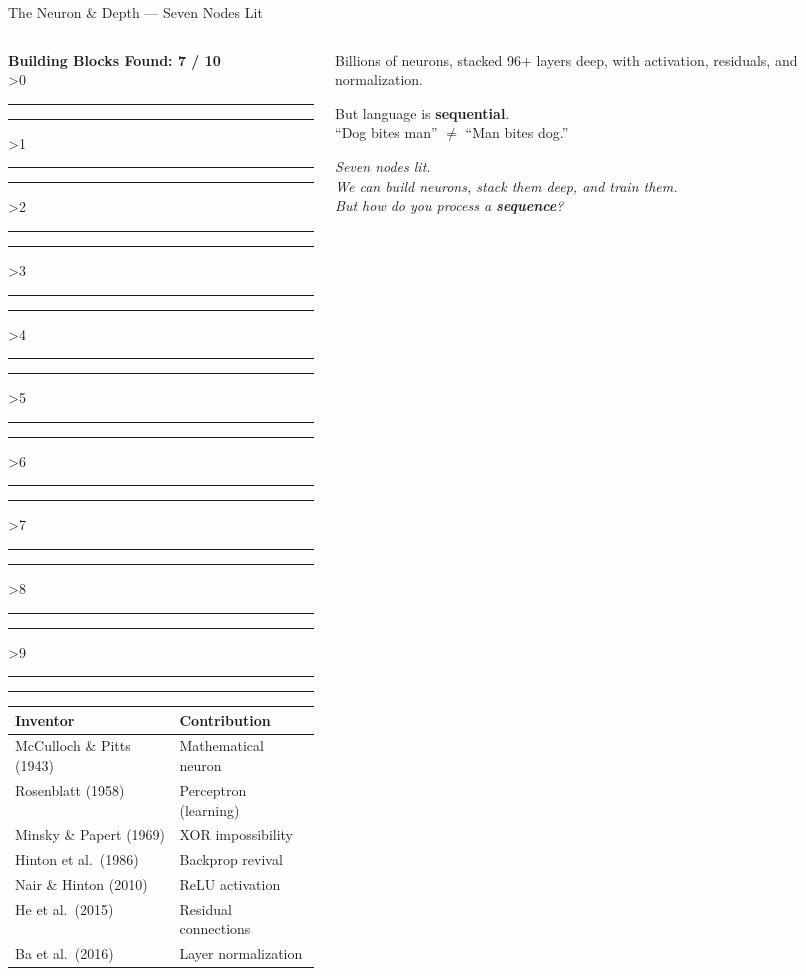 \documentclass[aspectratio=169,12pt]{beamer}
\newcommand{\convergencebar}[1]{%
  \begin{tcolorbox}[colframe=aiViolet!60, colback=white, boxrule=0.5pt,
    width=\textwidth, left=2pt, right=2pt, top=2pt, bottom=2pt]
  \centering\small\textbf{Building Blocks Found: #1 / 10}\\[4pt]
  \ifnum#1>0 \textcolor{linalgTeal}{\rule{8pt}{8pt}}\else\textcolor{gray!30}{\rule{8pt}{8pt}}\fi\hspace{2pt}%
  \ifnum#1>1 \textcolor{calculusRed}{\rule{8pt}{8pt}}\else\textcolor{gray!30}{\rule{8pt}{8pt}}\fi\hspace{2pt}%
  \ifnum#1>2 \textcolor{probBlue}{\rule{8pt}{8pt}}\else\textcolor{gray!30}{\rule{8pt}{8pt}}\fi\hspace{2pt}%
  \ifnum#1>3 \textcolor{infoAmber}{\rule{8pt}{8pt}}\else\textcolor{gray!30}{\rule{8pt}{8pt}}\fi\hspace{2pt}%
  \ifnum#1>4 \textcolor{logicGray}{\rule{8pt}{8pt}}\else\textcolor{gray!30}{\rule{8pt}{8pt}}\fi\hspace{2pt}%
  \ifnum#1>5 \textcolor{approxGreen}{\rule{8pt}{8pt}}\else\textcolor{gray!30}{\rule{8pt}{8pt}}\fi\hspace{2pt}%
  \ifnum#1>6 \textcolor{neuronPink}{\rule{8pt}{8pt}}\else\textcolor{gray!30}{\rule{8pt}{8pt}}\fi\hspace{2pt}%
  \ifnum#1>7 \textcolor{seqIndigo}{\rule{8pt}{8pt}}\else\textcolor{gray!30}{\rule{8pt}{8pt}}\fi\hspace{2pt}%
  \ifnum#1>8 \textcolor{aiViolet}{\rule{8pt}{8pt}}\else\textcolor{gray!30}{\rule{8pt}{8pt}}\fi\hspace{2pt}%
  \ifnum#1>9 \textcolor{accentOrange}{\rule{8pt}{8pt}}\else\textcolor{gray!30}{\rule{8pt}{8pt}}\fi%
  \end{tcolorbox}
}
\begin{document}
\begin{frame}{The Neuron \& Depth --- Seven Nodes Lit}

  \begin{columns}[T]
    \begin{column}{0.55\textwidth}
      \convergencebar{7}

      \vspace{0.3em}
      \begin{tcolorbox}[colback=neuronPink!5, colframe=neuronPink,
        fonttitle=\bfseries\small, title={Section Summary},
        rounded corners, boxrule=0.8pt, left=3pt, right=3pt, top=2pt, bottom=2pt]
        \scriptsize
        \begin{tabular}{@{}ll@{}}
          \toprule
          \textbf{Inventor} & \textbf{Contribution} \\
          \midrule
          McCulloch \& Pitts (1943) & Mathematical neuron \\
          Rosenblatt (1958) & Perceptron (learning) \\
          Minsky \& Papert (1969) & XOR impossibility \\
          Hinton et al.\ (1986) & Backprop revival \\
          Nair \& Hinton (2010) & ReLU activation \\
          He et al.\ (2015) & Residual connections \\
          Ba et al.\ (2016) & Layer normalization \\
          \bottomrule
        \end{tabular}
      \end{tcolorbox}
    \end{column}

    \begin{column}{0.42\textwidth}
      \begin{insightbox}
        \small
        Billions of neurons, stacked 96+ layers deep, with activation, residuals,
        and normalization.

        \vspace{0.3em}
        But language is \textbf{sequential}.\\
        ``Dog bites man'' $\neq$ ``Man bites dog.''
      \end{insightbox}

      \vspace{0.3em}
      {\small\itshape Seven nodes lit.\\[3pt]
       We can build neurons, stack them deep, and train them.\\[3pt]
       But how do you process a \textbf{sequence}?}
    \end{column}
  \end{columns}


\end{frame}
\end{document}
